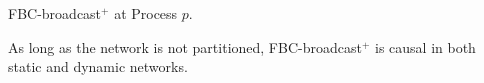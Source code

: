 \begin{algorithm}[h]
  
  \caption{\label{algo:bufferbroadcast}FBC-broadcast$^+$ at Process $p$.}
\end{algorithm}






\begin{theorem}
  As long as the network is not partitioned, FBC-broadcast$^+$ is causal in both
  static and dynamic networks.
\end{theorem}

